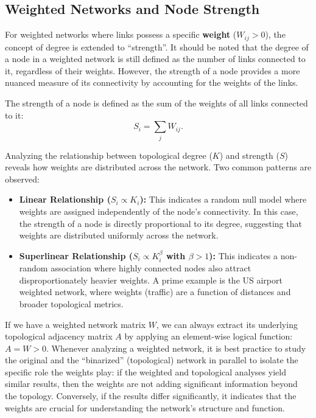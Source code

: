 \subsection{Weighted Networks and Node Strength}

For weighted networks where links possess a specific \textbf{weight} ($W_{ij} > 0$), the concept of degree is extended to ``strength''. It should be noted that the degree of a node in a weighted network is still defined as the number of links connected to it, regardless of their weights. However, the strength of a node provides a more nuanced measure of its connectivity by accounting for the weights of the links.

\begin{definition}
    The strength of a node is defined as the sum of the weights of all links connected to it:
    \[
        S_i = \sum_j W_{ij}.
    \]
\end{definition}

Analyzing the relationship between topological degree ($K$) and strength ($S$) reveals how weights are distributed across the network. Two common patterns are observed:
\begin{itemize}
    \item \textbf{Linear Relationship ($S_i \propto K_i$):} This indicates a random null model where weights are assigned independently of the node's connectivity. In this case, the strength of a node is directly proportional to its degree, suggesting that weights are distributed uniformly across the network.
    \item \textbf{Superlinear Relationship ($S_i \propto K_i^\beta$ with $\beta > 1$):} This indicates a non-random association where highly connected nodes also attract disproportionately heavier weights. A prime example is the US airport weighted network, where weights (traffic) are a function of distances and broader topological metrics.
\end{itemize}

\begin{remark}
    If we have a weighted network matrix $W$, we can always extract its underlying topological adjacency matrix $A$ by applying an element-wise logical function: $A = W > 0$. Whenever analyzing a weighted network, it is best practice to study the original and the ``binarized'' (topological) network in parallel to isolate the specific role the weights play: if the weighted and topological analyses yield similar results, then the weights are not adding significant information beyond the topology. Conversely, if the results differ significantly, it indicates that the weights are crucial for understanding the network's structure and function.
\end{remark}

